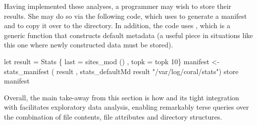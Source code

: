 Having implemented these analyses, a programmer may wish to store their
results.  She may do so via the following code, which
uses  to generate a manifest and 
to copy it over to the  directory.  In addition,
the code uses , which is a generic function
that constructs default metadata (a useful piece in situations 
like this one where newly constructed data must be stored).

\begin{code}
let result = Stats \{ last = sites_mod ()
                   , topk = topk 10\}
manifest <- stats_manifest 
  ( result
  , stats_defaultMd result "/var/log/coral/stats")
store manifest 
\end{code}




Overall, the main take-away from this section is how 
\forest{} and its tight integration with
\haskell{} facilitates exploratory data analysis,
enabling remarkably terse queries over the combination of file
contents, file attributes and directory structures.

